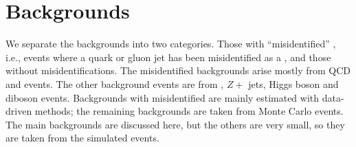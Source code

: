 \section{Backgrounds}
\label{sect:bkg}
We separate the backgrounds into two categories.  Those with 
``misidentified'' \Tau, i.e., events where a quark or gluon jet has been misidentified
as a \Tau, and those without \Tau misidentifications.  
The misidentified \Tau backgrounds arise mostly from QCD and \wjets events.  The 
other background events are from \ttbar, $Z+$ jets, Higgs boson and diboson events.
Backgrounds with misidentified \Tau are mainly estimated with data-driven methods; the 
remaining backgrounds are taken from Monte Carlo events. The main backgrounds
are discussed here, but the others are very small, so they are  taken from the simulated events.

